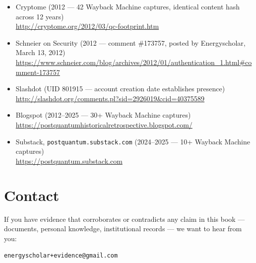 \begin{itemize}
\item \label{back:ts-cryptome} Cryptome (2012 --- 42 Wayback Machine captures, identical content hash across 12 years)\\
  \url{http://cryptome.org/2012/03/qc-footprint.htm}
\item \label{back:ts-schneier} Schneier on Security (2012 --- comment \#173757, posted by Energyscholar, March 13, 2012)\\
  \url{https://www.schneier.com/blog/archives/2012/01/authentication_1.html#comment-173757}
\item \label{back:ts-slashdot} Slashdot (UID 801915 --- account creation date establishes presence)\\
  \url{http://slashdot.org/comments.pl?sid=2926019&cid=40375589}
\item \label{back:ts-blogspot} Blogspot (2012--2025 --- 30+ Wayback Machine captures)\\
  \url{https://postquantumhistoricalretrospective.blogspot.com/}
\item \label{back:ts-substack} Substack, \texttt{postquantum.substack.com} (2024--2025 --- 10+ Wayback Machine captures)\\
  \url{https://postquantum.substack.com}
\end{itemize}

\section*{Contact}
\label{back:contact}

If you have evidence that corroborates or contradicts any claim in this book --- documents, personal knowledge, institutional records --- we want to hear from you:

\begin{center}
\texttt{energyscholar+evidence@gmail.com}
\end{center}
